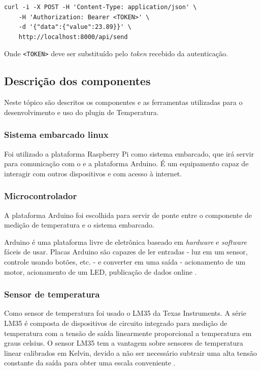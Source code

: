 \begin{verbatim}
curl -i -X POST -H 'Content-Type: application/json' \
    -H 'Authorization: Bearer <TOKEN>' \
    -d '{"data":{"value":23.89}}' \
    http://localhost:8000/api/send
\end{verbatim}

Onde \texttt{\textless{}TOKEN\textgreater{}} deve ser substituído pelo
\emph{token} recebido da autenticação.

\subsection{Descrição dos
componentes}\label{descriuxe7uxe3o-dos-componentes}

Neste tópico são descritos os componentes e as ferramentas utilizadas
para o desenvolvimento e uso do plugin de Temperatura.

\subsubsection{Sistema embarcado linux}\label{sistema-embarcado-linux}

Foi utilizado a plataforma Raspberry Pi como sistema embarcado, que irá
servir para comunicação com o \wm e a plataforma Arduino. É um
equipamento \iot
capaz de interagir com outros dispositivos e com acesso à internet.

\subsubsection{Microcontrolador}\label{microcontrolador}

A plataforma Arduino foi escolhida para servir de ponte entre o
componente de medição de temperatura e o sistema embarcado.

Arduino é uma plataforma livre de eletrônica baseado em \emph{hardware}
e \emph{software} fáceis de usar. Placas Arduino são capazes de ler
entradas - luz em um sensor, controle usando botões, etc. - e converter
em uma saída - acionamento de um motor, acionamento de um LED,
publicação de dados online \cite{arduino:2016}.

\subsubsection{Sensor de temperatura}\label{sensor-de-temperatura}

Como sensor de temperatura foi usado o LM35 da Texas Instruments. A
série LM35 é composta de dispositivos de circuito integrado para medição
de temperatura com a tensão de saída linearmente proporcional a
temperatura em graus celsius. O sensor LM35 tem a vantagem sobre
sensores de temperatura linear calibrados em Kelvin, devido a não ser
necessário subtrair uma alta tensão constante da saída para obter uma
escala conveniente \cite{lm35:2016}.

